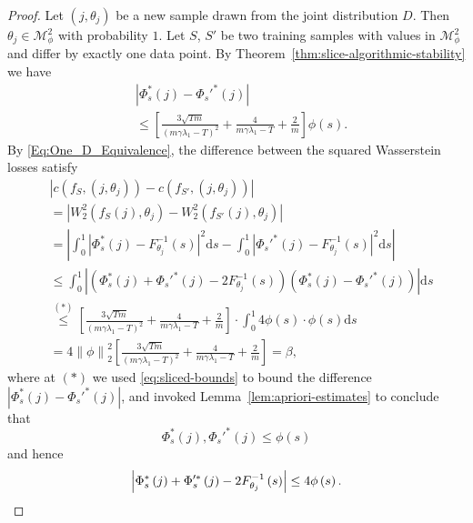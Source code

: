 \documentclass[letterpaper]{article} %
\begin{document}
\begin{proof}
  Let $\left( j,\theta_j \right)$ be a new sample drawn from the joint distribution $D$. Then $\theta_j\in\mathcal{M}_{\phi}^2$ with probability $1$. Let $S$, $S'$ be two training samples with values in $\mathcal{M}_{\phi}^2$ and differ by exactly one data point. By Theorem~\ref{thm:slice-algorithmic-stability} we have
  \begin{equation}
    \label{eq:sliced-bounds}
    \begin{aligned}
      &\left| \Phi_s^{*} \left( j \right) -\Phi_s'^{*} \left( j \right) \right| \\
      &\leq \left[\frac{3\sqrt{Tm}}{\left( m\gamma\lambda_1-T \right)^2}+\frac{4}{m\gamma\lambda_1-T}+\frac{2}{m}\right]\phi \left( s \right).
    \end{aligned}
  \end{equation}
By \eqref{Eq:One_D_Equivalence}, the difference between the squared Wasserstein losses satisfy
  \begin{equation*}
    \begin{aligned}
      &\left| c \left( f_S, \left( j,\theta_j \right) \right) - c \left( f_{S'}, \left( j,\theta_j \right) \right) \right|\\
      &=\left| W_2^2 \left( f_S \left( j \right),\theta_j \right) - W_2^2 \left( f_{S'} \left( j \right),\theta_j \right) \right|\\
      &=\left| \int_0^1 \left| \Phi_s^{*} \left( j \right)-F_{\theta_j}^{-1}\left( s \right) \right|^2\mathrm{d}s - \int_0^1 \left| \Phi_s'^{*} \left( j \right)-F_{\theta_j}^{-1}\left( s \right) \right|^2\mathrm{d}s \right|\\
      &\leq \int_0^1 \left| \left( \Phi_s^{*} \left( j \right)+\Phi_s'^{*} \left( j \right)-2F_{\theta_j}^{-1}\left( s \right) \right)\left( \Phi_s^{*} \left( j \right) -\Phi_s'^{*} \left( j \right) \right) \right| \mathrm{d}s\\
      &\stackrel{\left( * \right)}{\leq} \left[\frac{3\sqrt{Tm}}{\left( m\gamma\lambda_1-T \right)^2}+\frac{4}{m\gamma\lambda_1-T}+\frac{2}{m}\right]\cdot \int_0^1 4\phi \left( s \right)\cdot \phi \left( s \right)\mathrm{d}s\\
      &=4\left\| \phi \right\|_2^2\left[\frac{3\sqrt{Tm}}{\left( m\gamma\lambda_1-T \right)^2}+\frac{4}{m\gamma\lambda_1-T}+\frac{2}{m}\right]=\beta,
    \end{aligned}
  \end{equation*}
  where at $\left( * \right)$ we used \eqref{eq:sliced-bounds} to bound the difference $\left| \Phi_s^{*} \left( j \right) -\Phi_s'^{*} \left( j \right) \right|$, and invoked Lemma~\ref{lem:apriori-estimates} to conclude that
  \begin{equation*}
    \Phi_s^{*}\left( j \right),\Phi_s'^{*}\left( j \right) \leq \phi \left( s \right)
  \end{equation*}
  and hence
  \begin{equation*}
    \left| \Phi_s^{*} \left( j \right)+\Phi_s'^{*} \left( j \right)-2F_{\theta_j}^{-1}\left( s \right) \right|\leq 4\phi \left( s \right). \qedhere
  \end{equation*}
\end{proof}
\end{document}
